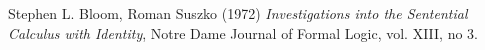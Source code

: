 \documentclass{article}
\theoremstyle{definition}
\theoremstyle{definition}
\begin{document}

\begin{thebibliography}{9}
    Stephen L. Bloom, Roman Suszko (1972) \emph{Investigations into the Sentential Calculus with Identity}, Notre Dame Journal of Formal Logic, vol. XIII, no 3.



\end{thebibliography}
\end{document}
